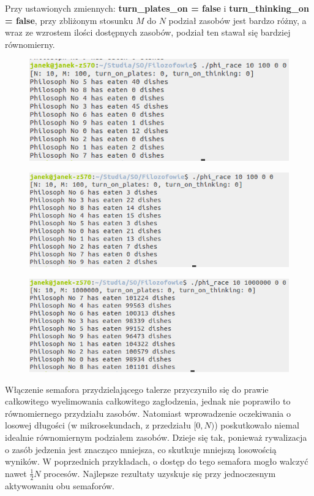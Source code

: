 \documentclass{article}
\begin{document}
Przy ustawionych zmiennych: \textbf{turn\_plates\_on = false} i \textbf{turn\_thinking\_on = false}, przy zbliżonym stosunku $M$ do $N$ podział zasobów jest bardzo różny, a wraz ze wzrostem ilości dostępnych zasobów, podział ten stawał się bardziej równomierny. 

\begin{figure}[h!]
\centering
\includegraphics[scale=0.4]{test_10_100_0_0.png}
\end{figure} 
\begin{figure}[h!]
\centering
\includegraphics[scale=0.4]{test2_10_100_0_0.png}
\end{figure} 
\begin{figure}[h!]
\centering
\includegraphics[scale=0.4]{test2_10_1000000_0_0.png}
\end{figure} 

\newpage

Włączenie semafora przydzielającego talerze przyczyniło się do  prawie całkowitego wyelimowania całkowitego zagłodzenia, jednak nie poprawiło to równomiernego przydziału zasobów. Natomiast wprowadzenie oczekiwania o losowej długości (w mikrosekundach, z przedziału $[0, N)$) poskutkowało niemal idealnie równomiernym podziałem zasobów. Dzieje się tak, ponieważ rywalizacja o zasób jedzenia jest znacząco mniejsza, co skutkuje mniejszą losowością wyników. W poprzednich przykładach, o dostęp do tego semafora mogło walczyć nawet $\frac{1}{2}N$ procesów. Najlepsze rezultaty uzyskuje się przy jednoczesnym aktywowaniu obu semaforów. 
\end{document}
